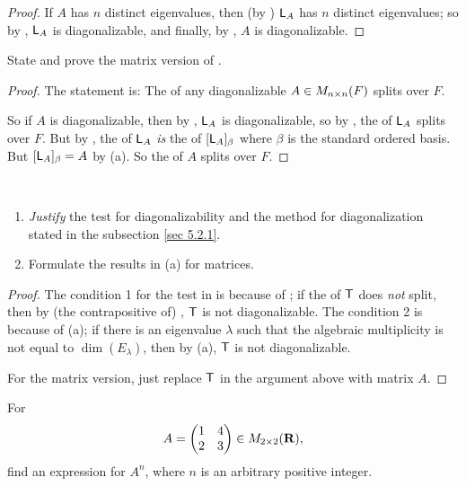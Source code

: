 \begin{proof}
If \(A\) has \(n\) distinct eigenvalues, then (by ) \(\textsf{L}_A\) has \(n\) distinct eigenvalues;
so by , \(\textsf{L}_A\) is diagonalizable, and finally, by , \(A\) is diagonalizable.
\end{proof}

\begin{exercise} \label{exercise 5.2.5}
State and prove the matrix version of .
\end{exercise}

\begin{proof}
The statement is:
The \CPOLY{} of any diagonalizable \(A \in M_{n \times n}(F)\) splits over \(F\).

So if \(A\) is diagonalizable, then by , \(\textsf{L}_A\) is diagonalizable, so by , the \CPOLY{} of \(\textsf{L}_A\) splits over \(F\).
But by , the \CPOLY{} of \(\textsf{L}_A\) \emph{is} the \CPOLY{} of \([\textsf{L}_A]_{\beta}\) where \(\beta\) is the standard ordered basis.
But \([\textsf{L}_A]_{\beta} = A\) by (a).
So the \CPOLY{} of \(A\) splits over \(F\).
\end{proof}

\begin{exercise} \label{exercise 5.2.6} \ 

\begin{enumerate}
\item \emph{Justify} the test for diagonalizability and the method for diagonalization stated in the subsection \ref{sec 5.2.1}.
\item Formulate the results in (a) for matrices.
\end{enumerate}
\end{exercise}

\begin{proof}
The condition 1 for the test in  is because of ;
if the \CPOLY{} of \(\textsf{T}\) does \emph{not} split, then by (the contrapositive of) , \(\textsf{T}\) is not diagonalizable.
The condition 2 is because of (a);
if there is an eigenvalue \(\lambda\) such that the algebraic multiplicity is not equal to \(\dim(E_{\lambda})\), then by (a), \(\textsf{T}\) is not diagonalizable.

For the matrix version, just replace \(\textsf{T}\) in the argument above with matrix \(A\).
\end{proof}

\begin{exercise} \label{exercise 5.2.7}
For
\[
    A = \begin{pmatrix} 1 & 4 \\ 2 & 3 \end{pmatrix} \in M_{2 \times 2}(\mathbf{R}),
\]
find an expression for \(A^n\), where \(n\) is an arbitrary positive integer.
\end{exercise}

